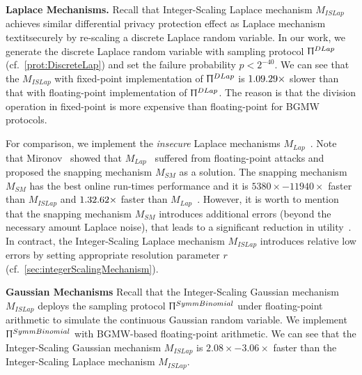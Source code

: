 \textbf{Laplace Mechanisms.}
Recall that Integer-Scaling Laplace mechanism $M_{ISLap} $ achieves similar differential privacy protection effect as Laplace mechanism textit{securely} by re-scaling a discrete Laplace random variable.
In our work, we generate the discrete Laplace random variable with sampling protocol $\Uppi^{DLap}$ (cf.~\autoref{prot:DiscreteLap}) and set the failure probability $p<2^{-40}$.
We can see that the $M_{ISLap}$ with fixed-point implementation of $\Uppi^{DLap}$ is $1.09\time-1.29\times$ slower than that with floating-point implementation of $\Uppi^{DLap}$.
The reason is that the division operation in fixed-point is more expensive than floating-point for BGMW protocols.

For comparison, we implement the \textit{insecure} Laplace mechanisms $M_{Lap}$~\cite{eigner2014differentially}.
Note that Mironov~\cite{mironov2014differentially} showed that $M_{Lap}$~\cite{eigner2014differentially} suffered from floating-point attacks and proposed the snapping mechanism $M_{SM}$ as a solution.
The snapping mechanism $M_{SM}$ has the best online run-times performance and it is $5380\times-11940\times $ faster than $M_{ISLap}$ and $1.32\time- 1.62\times$ faster than $M_{Lap}$~\cite{eigner2014differentially}.
However, it is worth to mention that the snapping mechanism $M_{SM}$ introduces additional errors (beyond the necessary amount Laplace noise), that leads to a significant reduction in utility~\cite{Covington2019,googleDP2019}.
In contract, the Integer-Scaling Laplace mechanism $M_{ISLap}$ introduces relative low errors by setting appropriate resolution parameter $r$ (cf.~\autoref{sec:integerScalingMechanism}).







\textbf{Gaussian Mechanisms}
Recall that the Integer-Scaling Gaussian mechanism $M_{ISLap}$ deploys the sampling protocol $\Uppi^{SymmBinomial}$ under floating-point arithmetic to simulate the continuous Gaussian random variable.
We implement $\Uppi^{SymmBinomial}$ with BGMW-based floating-point arithmetic.
We can see that the Integer-Scaling Gaussian mechanism $M_{ISLap}$ is $2.08\times-3.06\times$ faster than the Integer-Scaling Laplace mechanism $M_{ISLap}$.

